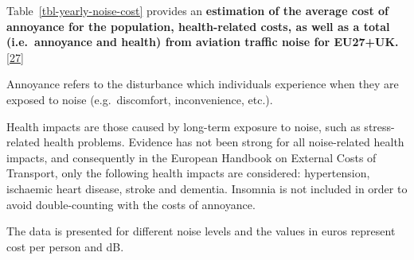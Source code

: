 \documentclass[
  11pt,
  a4paper,
]{book}
\begin{document}
Table~\ref{tbl-yearly-noise-cost} provides an \textbf{estimation of the
average cost of annoyance for the population, health-related costs, as
well as a total (i.e.~annoyance and health) from aviation traffic noise
for EU27+UK.}\protect\hyperlink{ref-ecdgmove2019}{{[}27{]}}

Annoyance refers to the disturbance which individuals experience when
they are exposed to noise (e.g.~discomfort, inconvenience, etc.).

Health impacts are those caused by long-term exposure to noise, such as
stress-related health problems. Evidence has not been strong for all
noise-related health impacts, and consequently in the European Handbook
on External Costs of Transport, only the following health impacts are
considered: hypertension, ischaemic heart disease, stroke and dementia.
Insomnia is not included in order to avoid double-counting with the
costs of annoyance.

The data is presented for different noise levels and the values in euros
represent cost per person and dB.
\end{document}
